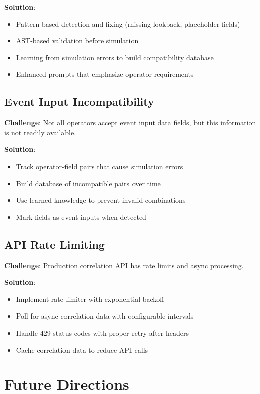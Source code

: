 \textbf{Solution}:
\begin{itemize}
    \item Pattern-based detection and fixing (missing lookback, placeholder fields)
    \item AST-based validation before simulation
    \item Learning from simulation errors to build compatibility database
    \item Enhanced prompts that emphasize operator requirements
\end{itemize}

\subsection{Event Input Incompatibility}

\textbf{Challenge}: Not all operators accept event input data fields, but this information is not readily available.

\textbf{Solution}:
\begin{itemize}
    \item Track operator-field pairs that cause simulation errors
    \item Build database of incompatible pairs over time
    \item Use learned knowledge to prevent invalid combinations
    \item Mark fields as event inputs when detected
\end{itemize}

\subsection{API Rate Limiting}

\textbf{Challenge}: Production correlation API has rate limits and async processing.

\textbf{Solution}:
\begin{itemize}
    \item Implement rate limiter with exponential backoff
    \item Poll for async correlation data with configurable intervals
    \item Handle 429 status codes with proper retry-after headers
    \item Cache correlation data to reduce API calls
\end{itemize}

\section{Future Directions}

